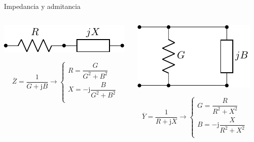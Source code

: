 \documentclass[aspectratio=169, xcolor={usenames,svgnames,dvipsnames}]{beamer}
\begin{document}
\begin{frame}{Impedancia y admitancia}
\begin{columns}
\begin{column}{0.5\columnwidth}
\begin{center}
\includegraphics[height=0.1\textheight]{../figs/Z.pdf}
\end{center}

\[
  \overline{Z} = \frac{1}{G + \mathrm{j} B} \rightarrow \left\{%
      \begin{array}{l}
	R = \dfrac{G}{G^2 + B^2}\\[5mm]
	X = - \mathrm{j} \dfrac{B}{G^2 + B^2}\\
      \end{array}\right.        
\]
\end{column}

\begin{column}{0.5\columnwidth}
\begin{center}
\includegraphics[height=0.25\textheight]{../figs/Y.pdf}
\end{center}

\[
  \overline{Y} = \frac{1}{R + \mathrm{j} X} \rightarrow \left\{%
      \begin{array}{l}
	G = \dfrac{R}{R^2 + X^2}\\[5mm]
	B = - \mathrm{j} \dfrac{X}{R^2 + X^2}\\
      \end{array}\right.        
\]
\end{column}
\end{columns}
\end{frame}
\end{document}
